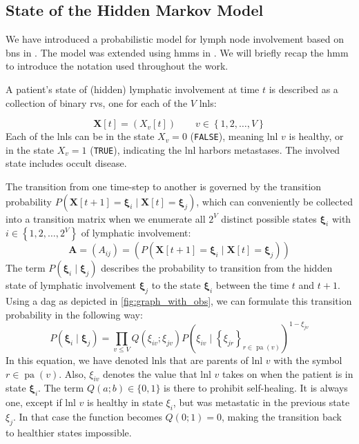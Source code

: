\documentclass[twocolumn]{article}
\begin{document}
\subsection{State of the Hidden Markov Model}
\label{subsec:formalism:state}

We have introduced a probabilistic model for lymph node involvement based on \glspl{bn} in \cite{pouymayou_bayesian_2019}. The model was extended using \glspl{hmm} in \cite{ludwig_hidden_2021}. We will briefly recap the \acrlong{hmm} to introduce the notation used throughout the work.

A patient's state of (hidden) lymphatic involvement at time $t$ is described as a collection of binary \glspl{rv}, one for each of the $V$ \glspl{lnl}:

\begin{equation}
    \mathbf{X}[t] = \left( X_v[t] \right) \qquad v \in \left\{ 1,2, \ldots, V \right\}
\end{equation}
%
Each of the \glspl{lnl} can be in the state $X_v=0$ (\texttt{FALSE}), meaning \gls{lnl} $v$ is healthy, or in the state $X_v=1$ (\texttt{TRUE}), indicating the \gls{lnl} harbors metastases. The involved state includes occult disease.

The transition from one time-step to another is governed by the transition probability $P\left( \mathbf{X}[t+1]=\boldsymbol{\xi}_i \mid \mathbf{X}[t]=\boldsymbol{\xi}_j \right)$, which can conveniently be collected into a transition matrix when we enumerate all $2^V$ distinct possible states $\boldsymbol{\xi}_i$ with $i \in \left\{ 1,2, \ldots, 2^V \right\}$ of lymphatic involvement:
%
\begin{equation}
    \mathbf{A} = \left( A_{ij} \right) = \left( P\left( \mathbf{X}[t+1]=\boldsymbol{\xi}_i \mid \mathbf{X}[t]=\boldsymbol{\xi}_j \right) \right)
\end{equation}
%
The term $P\left( \boldsymbol{\xi}_i \mid \boldsymbol{\xi}_j \right)$ describes the probability to transition from the hidden state of lymphatic involvement $\boldsymbol{\xi}_j$ to the state $\boldsymbol{\xi}_i$ between the time $t$ and $t+1$. Using a \gls{dag} as depicted in \cref{fig:graph_with_obs}, we can formulate this transition probability in the following way:
%
\begin{equation}
    \label{eq:transition_prob}
    P\left( \boldsymbol{\xi}_i \mid \boldsymbol{\xi}_j \right) = \prod_{v \leq V} Q\left( \xi_{iv} ; \xi_{jv} \right) P \left( \xi_{iv} \mid \left\{ \xi_{jr} \right\}_{r \in \operatorname{pa}(v)} \right)^{1 - \xi_{jv}}
\end{equation}
%
In this equation, we have denoted \glspl{lnl} that are parents of \gls{lnl} $v$ with the symbol $r\in\operatorname{pa}(v)$. Also, $\xi_{iv}$ denotes the value that \gls{lnl} $v$ takes on when the patient is in state $\boldsymbol{\xi}_i$. The term $Q(a;b) \in \{ 0,1 \}$ is there to prohibit self-healing. It is always one, except if \gls{lnl} $v$ is healthy in state $\xi_i$, but was metastatic in the previous state $\xi_j$. In that case the function becomes $Q(0;1) = 0$, making the transition back to healthier states impossible.
\end{document}
